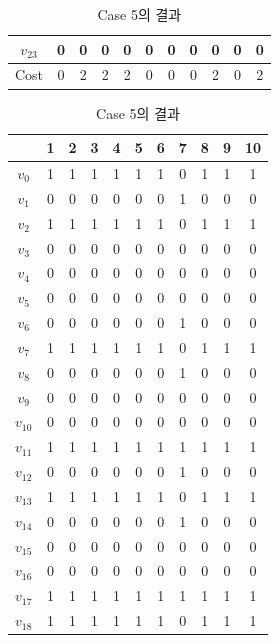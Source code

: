 \documentclass{article}
\begin{document}
\begin{table}[htb!]
\begin{minipage}{0.475\linewidth}
\begin{tabular}{c | c c c c c c c c c c}
        $v_{23}$ & 0 & 0 & 0 & 0 & 0 & 0 & 0 & 0 & 0 & 0 \\
        \hline
        Cost & 0 & 2 & 2 & 2 & 0 & 0 & 0 & 2 & 0 & 2 \\
        \hline
    \end{tabular}
    \caption{Case 5의 결과}
    \label{tab:result5}
    \end{minipage}
    \hspace{0.05\linewidth}
    \begin{minipage}{0.475\linewidth}
    \begin{tabular}{c | c c c c c c c c c c}
        \hline
        & 1 & 2 & 3 & 4 & 5 & 6 & 7 & 8 & 9 & 10 \\
        \hline
        $v_0$ & 1 & 1 & 1 & 1 & 1 & 1 & 0 & 1 & 1 & 1 \\
        $v_1$ & 0 & 0 & 0 & 0 & 0 & 0 & 1 & 0 & 0 & 0 \\
        $v_2$ & 1 & 1 & 1 & 1 & 1 & 1 & 0 & 1 & 1 & 1 \\
        $v_3$ & 0 & 0 & 0 & 0 & 0 & 0 & 0 & 0 & 0 & 0 \\
        $v_4$ & 0 & 0 & 0 & 0 & 0 & 0 & 0 & 0 & 0 & 0 \\
        $v_5$ & 0 & 0 & 0 & 0 & 0 & 0 & 0 & 0 & 0 & 0 \\
        $v_6$ & 0 & 0 & 0 & 0 & 0 & 0 & 1 & 0 & 0 & 0 \\
        $v_7$ & 1 & 1 & 1 & 1 & 1 & 1 & 0 & 1 & 1 & 1 \\
        $v_8$ & 0 & 0 & 0 & 0 & 0 & 0 & 1 & 0 & 0 & 0 \\
        $v_9$ & 0 & 0 & 0 & 0 & 0 & 0 & 0 & 0 & 0 & 0 \\
        $v_{10}$ & 0 & 0 & 0 & 0 & 0 & 0 & 0 & 0 & 0 & 0 \\
        $v_{11}$ & 1 & 1 & 1 & 1 & 1 & 1 & 1 & 1 & 1 & 1 \\
        $v_{12}$ & 0 & 0 & 0 & 0 & 0 & 0 & 1 & 0 & 0 & 0 \\
        $v_{13}$ & 1 & 1 & 1 & 1 & 1 & 1 & 0 & 1 & 1 & 1 \\
        $v_{14}$ & 0 & 0 & 0 & 0 & 0 & 0 & 1 & 0 & 0 & 0 \\
        $v_{15}$ & 0 & 0 & 0 & 0 & 0 & 0 & 0 & 0 & 0 & 0 \\
        $v_{16}$ & 0 & 0 & 0 & 0 & 0 & 0 & 0 & 0 & 0 & 0 \\
        $v_{17}$ & 1 & 1 & 1 & 1 & 1 & 1 & 1 & 1 & 1 & 1 \\
        $v_{18}$ & 1 & 1 & 1 & 1 & 1 & 1 & 0 & 1 & 1 & 1 \\

\end{tabular}
\end{minipage}
\end{table}
\end{document}
